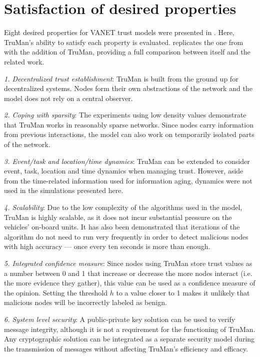 \section{Satisfaction of desired properties}
\label{section:satisfaction}

Eight desired properties for VANET trust models were presented in .
Here, TruMan's ability to satisfy each property is evaluated.
 replicates the one from  with the addition of TruMan, providing a full comparison between itself and the related work.

\textit{1. Decentralized trust establishment}:
TruMan is built from the ground up for decentralized systems.
Nodes form their own abstractions of the network and the model does not rely on a central observer.

\textit{2. Coping with sparsity}:
The experiments using low density values demonstrate that TruMan works in reasonably sparse networks.
Since nodes carry information from previous interactions, the model can also work on temporarily isolated parts of the network.

\textit{3. Event/task and location/time dynamics}:
TruMan can be extended to consider event, task, location and time dynamics when managing trust.
However, aside from the time-related information used for information aging, dynamics were not used in the simulations presented here.

\textit{4. Scalability}: 
Due to the low complexity of the algorithms used in the model, TruMan is highly scalable, as it does not incur substantial pressure on the vehicles' on-board units.
It has also been demonstrated that iterations of the algorithm do not need to run very frequently in order to detect malicious nodes with high accuracy --- once every ten seconds is more than enough.

\textit{5. Integrated confidence measure}:
Since nodes using TruMan store trust values as a number between 0 and 1 that increase or decrease the more nodes interact (i.e. the more evidence they gather), this value can be used as a confidence measure of the opinion.
Setting the threshold $h$ to a value closer to 1 makes it unlikely that malicious nodes will be incorrectly labeled as benign.

\textit{6. System level security}:
A public-private key solution can be used to verify message integrity, although it is not a requirement for the functioning of TruMan.
Any cryptographic solution can be integrated as a separate security model during the transmission of messages without affecting TruMan's efficiency and efficacy.

